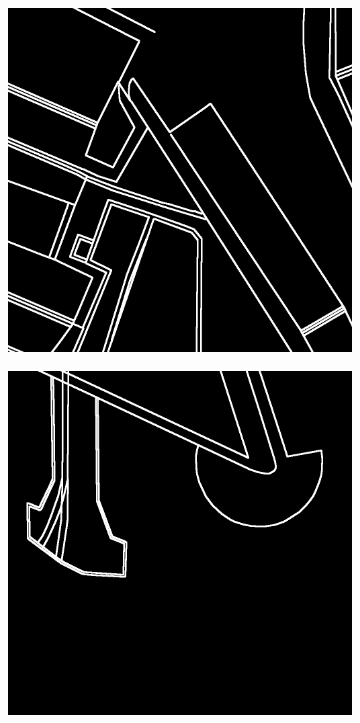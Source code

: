 \documentclass[12pt]{article}
\begin{document}
\begin{figure}[H]
\begin{subfigure}[b]{.235\textwidth}
\begin{minipage}[t]{1\linewidth}
			\includegraphics[width=1\linewidth]{images/patches/gt4.png}
			\caption{ }
		\end{minipage}
	\end{subfigure}
	\begin{subfigure}[b]{.235\textwidth}
		\begin{minipage}[t]{1\linewidth}
			\centering
			\includegraphics[width=1\linewidth]{images/patches/gt8.png}

\end{minipage}
\end{subfigure}
\end{figure}
\end{document}

